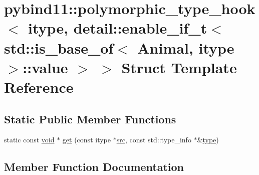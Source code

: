 \hypertarget{structpybind11_1_1polymorphic__type__hook_3_01itype_00_01detail_1_1enable__if__t_3_01std_1_1is__e83df67915b55f3d6bd9d21e755ef80f}{}\section{pybind11\+::polymorphic\+\_\+type\+\_\+hook$<$ itype, detail\+::enable\+\_\+if\+\_\+t$<$ std\+::is\+\_\+base\+\_\+of$<$ Animal, itype $>$\+::value $>$ $>$ Struct Template Reference}
\label{structpybind11_1_1polymorphic__type__hook_3_01itype_00_01detail_1_1enable__if__t_3_01std_1_1is__e83df67915b55f3d6bd9d21e755ef80f}
\subsection*{Static Public Member Functions}
\begin{DoxyCompactItemize}
\item 
static const \mbox{\hyperlink{_s_d_l__opengles2__gl2ext_8h_ae5d8fa23ad07c48bb609509eae494c95}{void}} $\ast$ \mbox{\hyperlink{structpybind11_1_1polymorphic__type__hook_3_01itype_00_01detail_1_1enable__if__t_3_01std_1_1is__e83df67915b55f3d6bd9d21e755ef80f_a787858a3fb194781da5bb91463efb2d8}{get}} (const itype $\ast$\mbox{\hyperlink{_s_d_l__opengl__glext_8h_a72e0fdf0f845ded60b1fada9e9195cd7}{src}}, const std\+::type\+\_\+info $\ast$\&\mbox{\hyperlink{_s_d_l__opengl_8h_ad5ddf6fca7b585646515660e810e0188}{type}})
\end{DoxyCompactItemize}


\subsection{Member Function Documentation}
\mbox{\label{structpybind11_1_1polymorphic__type__hook_3_01itype_00_01detail_1_1enable__if__t_3_01std_1_1is__e83df67915b55f3d6bd9d21e755ef80f_a787858a3fb194781da5bb91463efb2d8}} 
